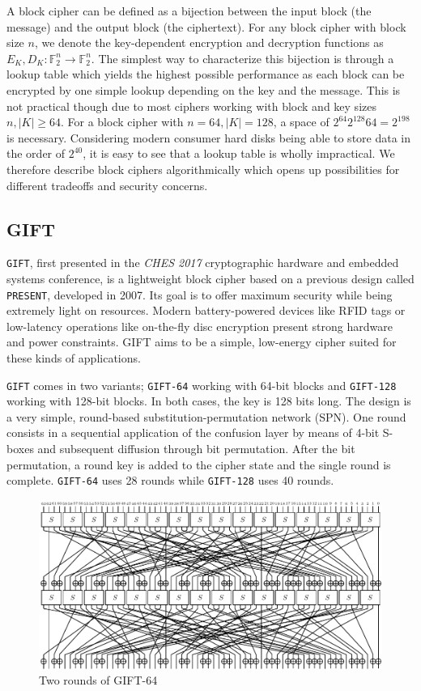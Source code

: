 \documentclass[12pt]{report}
\newcommand{\F}[1]{\mathbb{F}_2^{#1}}
\begin{document}
A block cipher can be defined as a bijection between the input block (the
message) and the output block (the ciphertext). For any block cipher with block
size $n$, we denote the key-dependent encryption and decryption functions as
$E_K,D_K:\F{n}\rightarrow \F{n}$. The simplest way to
characterize this bijection is through a lookup table which yields the highest
possible performance as each block can be encrypted by one simple lookup
depending on the key and the message. This is not practical though due to most
ciphers working with block and key sizes $n,|K|\geq 64$. For a block cipher
with $n=64,|K|=128$, a space of $2^{64}2^{128}64=2^{198}$ is necessary.
Considering modern consumer hard disks being able to store data in the order of
$2^{40}$, it is easy to see that a lookup table is wholly impractical. We
therefore describe block ciphers algorithmically which opens up possibilities
for different tradeoffs and security concerns.


\subsection{GIFT}

\texttt{GIFT}\cite{gift:2017}, first presented in the \textit{CHES 2017}
cryptographic hardware and embedded systems conference, is a lightweight block
cipher based on a previous design called \texttt{PRESENT}, developed in 2007. Its
goal is to offer maximum security while being extremely light on resources.
Modern battery-powered devices like RFID tags or low-latency operations like
on-the-fly disc encryption present strong hardware and power constraints. GIFT
aims to be a simple, low-energy cipher suited for these kinds of applications.

\texttt{GIFT} comes in two variants; \verb|GIFT-64| working with 64-bit blocks
and \texttt{GIFT-128} working with 128-bit blocks. In both cases, the key is 128
bits long. The design is a very simple, round-based substitution-permutation
network (SPN). One round consists in a sequential application of the confusion
layer by means of 4-bit S-boxes and subsequent diffusion through bit
permutation. After the bit permutation, a round key is added to the cipher
state and the single round is complete. \texttt{GIFT-64} uses 28 rounds while
\texttt{GIFT-128} uses 40 rounds.

\begin{figure}[h!]
    \centering
    \includegraphics[width=\textwidth]{Figures/GIFT-64.pdf}
    \caption{Two rounds of GIFT-64}
\end{figure}
\end{document}
